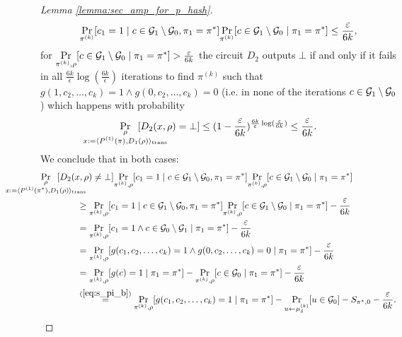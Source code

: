 \begin{proof}[Lemma \ref{lemma:sec_amp_for_p_hash}]
\begin{align}
  \underset{\pi^{(k)}}{\Pr}[c_1 = 1 \mid c \in \mathcal{G}_1 \setminus \mathcal{G}_0, \pi_1 = \pi^*] \underset{\pi^{(k)}}{\Pr}[c \in \mathcal{G}_1 \setminus \mathcal{G}_0 \mid \pi_1 = \pi^*] \leq \frac{\varepsilon}{6k},
\end{align}
for $\underset{\pi^{(k)}, \rho}{\Pr}[c \in \mathcal{G}_1 \setminus \mathcal{G}_0 \mid \pi_1 = \pi^*] > \frac{\varepsilon}{6k}$ the circuit $D_2$ outputs $\bot$
if and only if it fails in all $\frac{6k}{\epsilon} \log(\frac{6k}{\epsilon})$ iterations to find $\pi^{(k)}$ such that $g(1, c_2, \dots, c_k) = 1 \land g(0, c_2, \dots, c_k) = 0$
(i.e. in none of the iterations $c \in \mathcal{G}_1 \setminus \mathcal{G}_0$) which happens with probability
\begin{align}
\underset{
  \mathclap{
    \substack{
      \rho \\
      x := \langle P^{(1)}(\pi), D_1(\rho) \rangle_{\text{trans}}}}}
{\Pr}\mkern13mu[D_2(x,\rho) = \bot]
\leq (1 - \frac{\epsilon}{6k})^{\frac{6k}{\epsilon}\log(\frac{\epsilon}{6k})} \leq \frac{\epsilon}{6k}.
\end{align}
We conclude that in both cases:
\begin{align}
  \label{ineq:first_part}
  &\underset{
    \mathclap{
    \substack{\rho \\
      x := \langle P^{(1)}(\pi^*), D_1(\rho) \rangle_{\text{trans}}}}}
  {\Pr}\mkern13mu[D_2(x,\rho) \neq \bot]
  \underset{\pi^{(k)}, \rho}{\Pr}[c_1 = 1 \mid c \in \cG_1 \setminus \cG_0, \pi_1 = \pi^*]
  \underset{\pi^{(k)}, \rho}{\Pr}[c \in \cG_1 \setminus \cG_0 \mid \pi_1 = \pi^*] \notag\\
  &\IndII \geq \underset{\pi^{(k)}, \rho}{\Pr}[c_1 = 1 \mid c \in \cG_1 \setminus \cG_0, \pi_1 = \pi^*]\underset{\pi^{(k)}, \rho}
  {\Pr}[c \in \cG_1 \setminus \cG_0 \mid \pi_1 = \pi^*] - \frac{\epsilon}{6k} \notag\\
  &\IndII = \underset{\pi^{(k)}, \rho}{\Pr}[c_1 = 1 \land c \in \cG_0 \setminus \cG_1 \mid \pi_1 = \pi^*] - \frac{\epsilon}{6k} \notag\\
  &\IndII = \underset{\pi^{(k)}, \rho}{\Pr}[g(c_1, c_2,\dots, c_k) = 1 \land g(0, c_2, \dots, c_k) = 0 \mid \pi_1 = \pi^*] - \frac{\epsilon}{6k} \notag\\
  &\IndII = \underset{\pi^{(k)}, \rho}{\Pr}[g(c) = 1 \mid \pi_1 = \pi^*] -  \underset{\pi^{(k)}, \rho}{\Pr}[c \in \cG_0 \mid \pi_1 = \pi^*] - \frac{\epsilon}{6k} \notag\\
  &\IndII \stackrel{(\ref{eq:s_pi_b})}{=}
   \underset{\pi^{(k)}, \rho}{\Pr}[g(c_1, c_2,\dots, c_k) = 1 \mid \pi_1 = \pi^*] -  \underset{u \leftarrow \mu_{\delta}^{(k)}}{\Pr}[u \in \cG_0]  - S_{\pi^*,0} - \frac{\epsilon}{6k}.

\end{align}
\end{proof}
